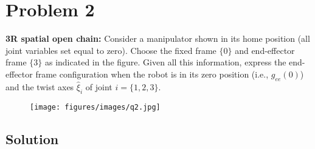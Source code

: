 \section*{Problem 2}
\setcounter{section}{2}
\setcounter{equation}{0}

\textbf{3R spatial open chain:}
Consider a manipulator shown in its home position (all joint variables set equal to zero).
Choose the fixed frame \( \{0\} \) and end-effector frame \( \{3\} \) as indicated in the figure.
Given all this information, express the end-effector frame configuration when the robot is in its zero position (i.e., \( g_{e e}(0) \)) and the twist axes \( \widehat{\xi}_{i} \) of joint \( i=\{1,2,3\} \).

\begin{figure}[h]
    \centering
    \texttt{[image: figures/images/q2.jpg]}
\end{figure}

\subsection*{Solution}

